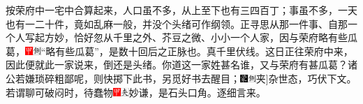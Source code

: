 按荣府中一宅中合算起来，人口虽不多，从上至下也有三四百丁；事虽不多，一天也有一二十件，竟如乱麻一般，并没个头绪可作纲领。正寻思从那一件事、自那一个人写起方妙，恰好忽从千里之外、芥豆之微、小小一个人家，因与荣府略有些瓜葛，{\includegraphics[width=3mm]{../Images/00002}\includegraphics[width=3mm]{../Images/00011}\footnotesize \kaishu “略有些瓜葛”，是数十回后之正脉也。真千里伏线。}这日正往荣府中来，因此便就此一家说来，倒还是头绪。你道这一家姓甚名谁，又与荣府有甚瓜葛？诸公若嫌琐碎粗鄙呢，则快掷下此书，另觅好书去醒目；{\includegraphics[width=3mm]{../Images/00006}\includegraphics[width=3mm]{../Images/00011}\footnotesize \kaishu {(加)}{[}夹{]}杂世态，巧伏下文。}若谓聊可破闷时，待蠢物{\includegraphics[width=3mm]{../Images/00002}\includegraphics[width=3mm]{../Images/00012}\footnotesize \kaishu 妙谦，是石头口角。}逐细言来。


